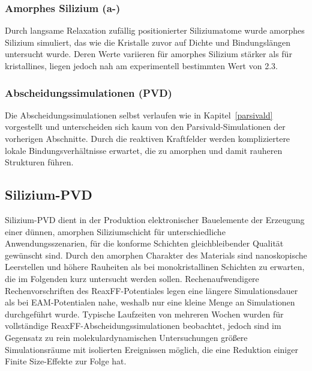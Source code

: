 \subsubsection{Amorphes Silizium (a-)}

Durch langsame Relaxation zufällig positionierter Siliziumatome wurde amorphes Silizium simuliert, das wie die Kristalle zuvor auf Dichte und Bindungslängen untersucht wurde.
Deren Werte variieren für amorphes Silizium stärker als für kristallines, liegen jedoch nah am experimentell bestimmten Wert von \SI{2.3}{\gpcc}\cite{remes_optical_1998}.

\subsubsection{Abscheidungssimulationen (PVD)}

Die Abscheidungssimulationen selbst verlaufen wie in Kapitel~\ref{parsivald} vorgestellt und unterscheiden sich kaum von den Parsivald-Simulationen der vorherigen Abschnitte.
Durch die reaktiven Kraftfelder werden kompliziertere lokale Bindungsverhältnisse erwartet, die zu amorphen und damit rauheren Strukturen führen.

\subsection{Silizium-PVD}

Silizium-PVD dient in der Produktion elektronischer Bauelemente der Erzeugung einer dünnen, amorphen Siliziumschicht für unterschiedliche Anwendungsszenarien, für die konforme Schichten gleichbleibender Qualität gewünscht sind.
Durch den amorphen Charakter des Materials sind nanoskopische Leerstellen und höhere Rauheiten als bei monokristallinen Schichten zu erwarten, die im Folgenden kurz untersucht werden sollen.
Rechenaufwendigere Rechenvorschriften des ReaxFF-Potentiales legen eine längere Simulationsdauer als bei EAM-Potentialen nahe, weshalb nur eine kleine Menge an Simulationen durchgeführt wurde.
Typische Laufzeiten von mehreren Wochen wurden für vollständige ReaxFF-Abscheidungssimulationen beobachtet, jedoch sind im Gegensatz zu rein molekulardynamischen Untersuchungen größere Simulationsräume mit isolierten Ereignissen möglich, die eine Reduktion einiger Finite Size-Effekte zur Folge hat.

